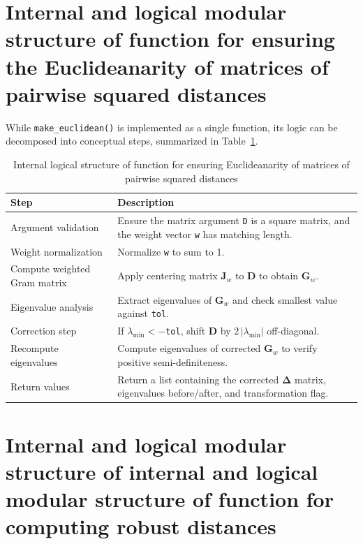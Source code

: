\section{Internal and logical modular structure of function for ensuring the Euclideanarity of matrices of pairwise squared distances}
\label{AppMakeEuclidean}

While \texttt{make\_euclidean()} is implemented as a single function, its logic can be decomposed into conceptual steps, summarized in Table~\ref{tab:modular-structure-euclidean}.

\begin{table}[h!]
\caption{Internal logical structure of function for ensuring Euclideanarity of matrices of pairwise squared distances}
\label{tab:modular-structure-euclidean}
\begin{center}
{\footnotesize
\begin{tabular}{|p{3.5cm}p{10.2cm}|}
\hline
\textbf{Step} & \textbf{Description} \\
\hline
Argument validation & Ensure the matrix argument \texttt{D} is a square matrix, and the weight vector \texttt{w} has matching length. \\
\hline
Weight normalization & Normalize \texttt{w} to sum to 1. \\
\hline
Compute weighted Gram matrix & Apply centering matrix $\mathbf{J}_w$ to $\mathbf{D}$ to obtain $\mathbf{G}_w$. \\
\hline
Eigenvalue analysis & Extract eigenvalues of $\mathbf{G}_w$ and check smallest value against \texttt{tol}. \\
\hline
Correction step & If $\lambda_{\min} < -$\verb+tol+, %
shift $\mathbf{D}$ by $2\,|\lambda_{\min}|$ off-diagonal. \\
\hline
Recompute eigenvalues & Compute eigenvalues of corrected $\mathbf{G}_w$ to verify positive semi-definiteness. \\
\hline
Return values & Return a list containing the corrected $\mathbf{\Delta}$ matrix, eigenvalues before/after, and transformation flag. \\
\hline
\end{tabular}}
\end{center}
\end{table}

\section{Internal and logical modular structure of internal and logical modular structure of function for computing robust distances}
\label{AppRobustDistances}

